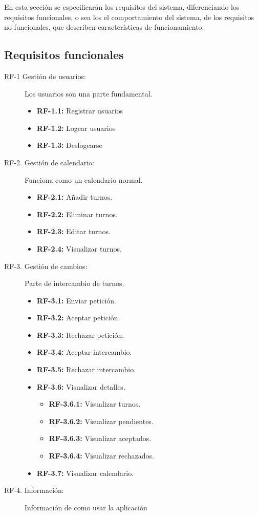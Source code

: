En esta sección se especificarán los requisitos del sistema, diferenciando los requisitos funcionales, o sea los  el comportamiento del sistema, de los requisitos no funcionales, que describen características de funcionamiento.
\subsection{Requisitos funcionales}\label{r-funcionales}
\begin{description}
    \item[RF-1 Gestión de usuarios:] Los usuarios son una parte fundamental.
    \begin{itemize}
         \item \textbf{RF-1.1:} Registrar usuarios
         \item \textbf{RF-1.2:} Logear usuarios
         \item \textbf{RF-1.3:} Deslogearse
    \end{itemize}
   \item[RF-2. Gestión de calendario:] Funciona como un calendario normal.
    \begin{itemize}
         \item \textbf{RF-2.1:} Añadir turnos.
         \item \textbf{RF-2.2:} Eliminar turnos.
         \item \textbf{RF-2.3:} Editar turnos.
         \item \textbf{RF-2.4:} Visualizar turnos.
    \end{itemize}
 	   \item[RF-3. Gestión de cambios:] Parte de intercambio de turnos.
    \begin{itemize}
         \item \textbf{RF-3.1:} Enviar petición.
         \item \textbf{RF-3.2:} Aceptar petición.
         \item \textbf{RF-3.3:} Rechazar petición. 
         \item \textbf{RF-3.4:} Aceptar intercambio.
         \item \textbf{RF-3.5:} Rechazar intercambio.
         \item \textbf{RF-3.6:} Visualizar detalles.
           \begin{itemize}
             \item \textbf{RF-3.6.1:} Visualizar turnos.
             \item \textbf{RF-3.6.2:} Visualizar pendientes.
             \item \textbf{RF-3.6.3:} Visualizar aceptados.
             \item \textbf{RF-3.6.4:} Visualizar rechazados.
           \end{itemize}
         \item \textbf{RF-3.7:} Visualizar calendario.
    \end{itemize}
       
    
    
   \item[RF-4. Información:] Información de como usar la aplicación
\end{description}


